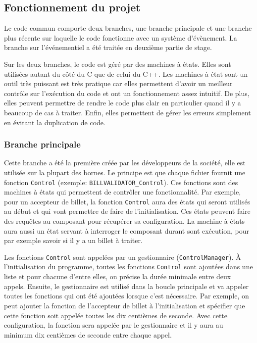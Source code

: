 \documentclass[a4paper]{article}
\begin{document}
\subsection*{Fonctionnement du projet}

Le code commun comporte deux branches, une branche principale et une branche
plus récente sur laquelle le code fonctionne avec un système d'évènement. La
branche sur l'événementiel a été traitée en deuxième partie de stage.

Sur les deux branches, le code est géré par des machines à états. Elles sont
utilisées autant du côté du C que de celui du C++. Les machines à état sont un
outil très puissant est très pratique car elles permettent d'avoir un meilleur
contrôle sur l'exécution du code et ont un fonctionnement assez intuitif. De
plus, elles peuvent permettre de rendre le code plus clair en particulier quand
il y a beaucoup de cas à traiter. Enfin, elles permettent de gérer les erreurs
simplement en évitant la duplication de code.

\subsubsection*{Branche principale}

Cette branche a été la première créée par les développeurs de la société, elle
est utilisée sur la plupart des bornes. Le principe est que chaque fichier
fournit une fonction \verb|Control| (exemple: \verb|BILLVALIDATOR_Control|). Ces
fonctions sont des machines à états qui permettent de contrôler une
fonctionnalité. Par exemple, pour un accepteur de billet, la fonction
\verb|Control| aura des états qui seront utilisés au début et qui vont permettre
de faire de l'initialisation. Ces états peuvent faire des requêtes au composant
pour récupérer sa configuration. La machine à états aura aussi un état servant à
interroger le composant durant sont exécution, pour par exemple savoir si il y a
un billet à traiter.

Les fonctions \verb|Control| sont appelées par un gestionnaire
(\verb|ControlManager|). À l'initialisation du programme, toutes les fonctions
\verb|Control| sont ajoutées dans une liste et pour chacune d'entre elles, on
précise la durée minimale entre deux appels. Ensuite, le gestionnaire est
utilisé dans la boucle principale et va appeler toutes les fonctions qui ont été
ajoutées lorsque c'est nécessaire. Par exemple, on peut ajouter la fonction de
l'accepteur de billet à l'initialisation et spécifier que cette fonction soit
appelée toutes les dix centièmes de seconde. Avec cette configuration, la
fonction sera appelée par le gestionnaire et il y aura au minimum dix centièmes
de seconde entre chaque appel.
\end{document}
